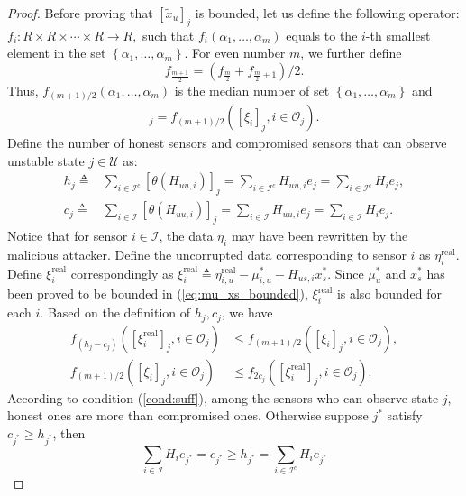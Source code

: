 \documentclass[journal]{IEEEtran}
\newcommand{\Ic}{{\mathcal{I}}}
\newcommand{\Uc}{{\mathcal{U}}}
\newcommand{\Oc}{{\mathcal{O}}}
\newcommand{\re}{\text{real}}
\newtheorem*{proof}{\textbf{Proof}}
\begin{document}
\begin{proof}
		Before proving that $[\tilde{x}_u]_j$ is bounded, let us define the following operator: $f_{i}: R \times R \times \cdots \times R \rightarrow R,$ such that $f_{i}\left(\alpha_{1}, \ldots, \alpha_{m}\right)$ equals to the $i$-th smallest element in the set $\left\{\alpha_{1}, \ldots, \alpha_{m}\right\} .$ For even number $m$, we further define 
		$$f_{\frac{m+1}{2}} = \left(f_{\frac{m}{2}} + f_{\frac{m}{2}+1}\right)/2.$$ 
		Thus, $f_{(m+1)/2}\left(\alpha_{1}, \ldots, \alpha_{m}\right)$ is the median number of set $\left\{\alpha_{1}, \ldots, \alpha_{m}\right\}$ and 
		\begin{align*}
			[\tilde{x}_u]_j = f_{(m+1)/2}\left([\xi_i]_j, i\in\Oc_j\right).
		\end{align*}
		Define the number of honest sensors and compromised sensors that can observe unstable state $j\in\Uc$ as:
		\begin{align*}
			h_j\triangleq &\sum_{i\in\Ic^c} [\theta(H_{uu,i})]_j = \sum_{i\in\Ic^c} H_{uu,i}e_j =\sum_{i\in\Ic^c} H_{i}e_j, \\
			c_j\triangleq &\sum_{i\in\Ic} [\theta(H_{uu,i})]_j = \sum_{i\in\Ic} H_{uu,i}e_j =\sum_{i\in\Ic} H_{i}e_j.
		\end{align*}
		Notice that for sensor $i\in\Ic$, the data $\eta_{i}$ may have been rewritten by the malicious attacker. Define the uncorrupted data corresponding to sensor $i$ as $\eta^{\re}_{i}$. Define $\xi^{\re}_{i}$ correspondingly as $\xi^\re_i\triangleq \eta^\re_{i,u}-\mu^*_{i,u}- H_{us,i} x^*_s $.
		Since $\mu^*_u$ and $x^*_s$ has been proved to be bounded in (\ref{eq:mu_xs_bounded}), $\xi^\re_i$ is also bounded for each $i$.
		Based on the definition of $h_j,c_j$, we have
		\begin{align}	
			f_{(h_j-c_j)}\left([\xi^\re_i]_j, i\in\Oc_j\right) &\leq
			f_{(m+1)/2}\left([\xi_i]_j, i\in\Oc_j\right), \label{eq:x_u_leftbound}\\
			f_{(m+1)/2}\left([\xi_i]_j, i\in\Oc_j\right)&\leq 
			f_{2c_j}\left([\xi^\re_i]_j, i\in\Oc_j\right) .  \label{eq:x_u_rightbound}
		\end{align}
		According to condition (\ref{cond:suff}), among the sensors who can observe state $j$, honest ones are more than compromised ones. Otherwise suppose $j^*$ satisfy $ c_{j^*}\geq h_{j^*}$, then
		$$\sum_{i\in\Ic} H_i e_{j^*}  =c_{j^*} \geq h_{j^*} =\sum_{i\in\Ic^c} H_{i} e_{j^*} $$

\end{proof}
\end{document}
